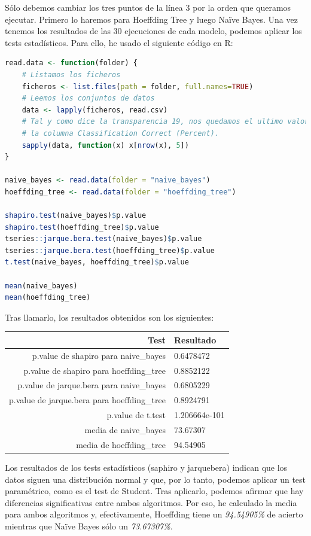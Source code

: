 \documentclass[11pt]{article}
\begin{document}
Sólo debemos cambiar los tres puntos de la línea 3 por la orden que queramos ejecutar. Primero lo haremos para Hoeffding Tree y luego Na\"{i}ve Bayes. Una vez tenemos los resultados de las 30 ejecuciones de cada modelo, podemos aplicar los tests estadísticos. Para ello, he usado el siguiente código en R:

\begin{lstlisting}[language=R]
read.data <- function(folder) {
	# Listamos los ficheros
	ficheros <- list.files(path = folder, full.names=TRUE)
	# Leemos los conjuntos de datos
	data <- lapply(ficheros, read.csv)
	# Tal y como dice la transparencia 19, nos quedamos el ultimo valor de 
	# la columna Classification Correct (Percent).
	sapply(data, function(x) x[nrow(x), 5])
}

naive_bayes <- read.data(folder = "naive_bayes")
hoeffding_tree <- read.data(folder = "hoeffding_tree")

shapiro.test(naive_bayes)$p.value
shapiro.test(hoeffding_tree)$p.value
tseries::jarque.bera.test(naive_bayes)$p.value
tseries::jarque.bera.test(hoeffding_tree)$p.value
t.test(naive_bayes, hoeffding_tree)$p.value

mean(naive_bayes)
mean(hoeffding_tree)
\end{lstlisting}

Tras llamarlo, los resultados obtenidos son los siguientes:

\begin{table}[H]
	\centering
	\begin{tabular}{rl}
		\textbf{Test} & \textbf{Resultado} \\ \hline
		p.value de shapiro para naive\_bayes & 0.6478472 \\
		p.value de shapiro para hoeffding\_tree & 0.8852122 \\
		p.value de jarque.bera para naive\_bayes & 0.6805229 \\
		p.value de jarque.bera para hoeffding\_tree & 0.8924791 \\
		p.value de t.test & 1.206664e-101 \\
		media de naive\_bayes & 73.67307 \\
		media de hoeffding\_tree & 94.54905
	\end{tabular}
\end{table}

Los resultados de los tests estadísticos (saphiro y jarquebera) indican que los datos siguen una distribución normal y que, por lo tanto, podemos aplicar un test paramétrico, como es el test de Student. Tras aplicarlo, podemos afirmar que hay diferencias significativas entre ambos algoritmos. Por eso, he calculado la media para ambos algoritmos y, efectivamente, Hoeffding tiene un \textit{94.54905\%} de acierto mientras que Na\"{i}ve Bayes sólo un \textit{73.67307\%}.
\end{document}
